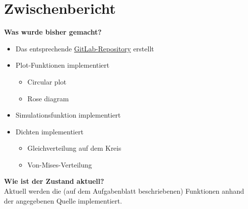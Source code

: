 \documentclass{scrartcl}
\begin{document}
\section*{Zwischenbericht}
\noindent\textbf{Was wurde bisher gemacht?}
\begin{itemize}
	\item Das entsprechende \href{https://gitlab.com/Jan-Agatz/circulardata}{GitLab-Repository} erstellt
	\item Plot-Funktionen implementiert
	\begin{itemize}
			\item Circular plot
			\item Rose diagram
		  \end{itemize}
	\item Simulationsfunktion implementiert
	\item Dichten implementiert
	\begin{itemize}
		\item Gleichverteilung auf dem Kreis
		\item Von-Mises-Verteilung
	\end{itemize}
\end{itemize}


\noindent\textbf{Wie ist der Zustand aktuell?} \\
\noindent Aktuell werden die (auf dem Aufgabenblatt beschriebenen) Funktionen anhand der angegebenen Quelle implementiert. \\

\end{document}
